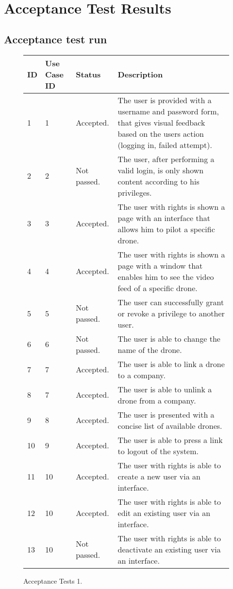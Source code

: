 \chapter{Acceptance Test Results}
\label{appendix:acceptance_test_results}

\section{Acceptance test run}
\begin{figure}[htb]
\begin{center}
\begin{tabular}{ | l | l | l | p{8cm} | }
  \hline
	\textbf{ID} & \textbf{Use Case ID} & \textbf{Status} & \textbf{Description} \\ \hline
	1 & 1 & Accepted. & The user is provided with a username and password form, that gives visual feedback based on the users action (logging in, failed attempt).\\ \hline
	2 & 2 & Not passed. & The user, after performing a valid login, is only shown content according to his privileges. \\ \hline
	3 & 3 & Accepted. & The user with rights is shown a page with an interface that allows him to pilot a specific drone.\\ \hline
	4 & 4 & Accepted. & The user with rights is shown a page with a window that enables him to see the video feed of a specific drone. \\ \hline
	5 & 5 & Not passed. & The user can successfully grant or revoke a privilege to another user. \\ \hline
	6 & 6 & Not passed. & The user is able to change the name of the drone. \\ \hline
	7 & 7 & Accepted. & The user is able to link a drone to a company.\\ \hline
	8 & 7 & Accepted. & The user is able to unlink a drone from a company.  \\ \hline
	9 & 8 & Accepted. & The user is presented with a concise list of available drones.  \\ \hline
	10 & 9 & Accepted. & The user is able to press a link to logout of the system.  \\ \hline
	11 & 10 & Accepted. & The user with rights is able to create a new user via an interface.  \\ \hline
	12 & 10 & Accepted. & The user with rights is able to edit an existing user via an interface.  \\ \hline
	13 & 10 & Not passed. & The user with rights is able to deactivate an existing user via an interface.  \\

  \hline
\end{tabular}
\caption{Acceptance Tests 1.}
\label{tab:acceptance_tests1_results}
\end{center}
\end{figure}

